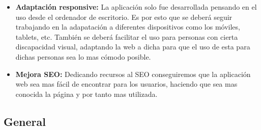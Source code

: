 \begin{itemize}
  \item \textbf{Adaptación responsive:} La aplicación solo fue desarrollada pensando en el
    uso desde el ordenador de escritorio. Es por esto que se deberá seguir trabajando en la
    adapatación a diferentes dispositivos como los móviles, tablets, etc. También se deberá
    facilitar el uso para personas con cierta discapacidad visual, adaptando la web a dicha
    para que el uso de esta para dichas personas sea lo mas cómodo posible.
  \item \textbf{Mejora SEO:} Dedicando recursos al SEO conseguiremos que la aplicación web
    sea mas fácil de encontrar para los usuarios, haciendo que sea mas conocida la página y
    por tanto mas utilizada.
\end{itemize}

\subsection{General}
